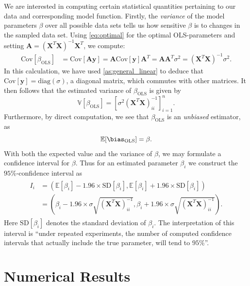 \documentclass[dvipsnames, article, a4paper, oneside, 12pt]{memoir}
\newcommand{\X}{\bm{X}}
\newcommand{\diag}[1]{\mathrm{diag}(#1)}
\newcommand{\expect}{\mathbb{E}}
\newcommand{\var}{\mathbb{V}}
\newcommand{\cov}{\mathrm{Cov}}
\newcommand{\OLS}{\mathrm{OLS}}
\newcommand{\SD}{\mathrm{SD}}
\newcommand{\mat}[1]{\bm{#1}}
\newcommand{\y}{\bm{y}}
\begin{document}
  We are interested in computing certain statistical quantities pertaining to
  our data and corresponding model function. Firstly, the \emph{variance} of
  the model parameters \( \beta \) over all possible data sets tells us how
  sensitive \( \beta \) is to changes in the sampled data set. Using
  \cref{eq:optimal} for the optimal OLS-parameters and setting \( \mat{A} =
  (\X^T\X)^{-1}\X^T\), we compute:
  \begin{align}
	  \label{eq:ols_variance}
	  \cov\left[\beta_{\OLS}\right] &= \cov\left[\mat{A}\y\right] = \mat{A} \cov\left[\y\right] \mat{A}^T = \mat{A}\mat{A}^T\sigma^2 = (\X^T{\X})^{-1} \sigma^2.
  \end{align}
  In this calculation, we have used \cref{as:general_linear} to deduce that \(
  \cov[ \y ] = \diag{\sigma}\), a diagonal matrix, which commutes with other
  matrices. It then follows that the estimated variance of \( \beta_{\OLS} \) is given by
  \begin{equation}
	  \var[\beta_{\OLS}] = [\sigma^2 (\X^T\X)^{-1}_{ii} ]_{i=1}^n.
  \end{equation}
  Furthermore, by direct computation, we see that \( \beta_{\OLS} \) is an \emph{unbiased} estimator,
  as 
  \begin{equation}
	  \expect[\bias_{\OLS}] = \beta.
  \end{equation}
  With both the expected value and the variance of \( \beta \), we may
  formulate a confidence interval for \( \beta \). Thus for an estimated
  parameter \( \beta_i \) we construct the
  \(95\%\)-confidence interval as
  \begin{align}
	  \begin{split}
		  I_i &= (\expect[\beta_i] - 1.96 \times \SD[\beta_i], \expect[\beta_i] + 1.96 \times \SD[\beta_i]) \\
		      &= \left(\beta_i - 1.96 \times \sigma \sqrt{(\X^T\X)^{-1}_{ii}}, \beta_i + 1.96 \times \sigma \sqrt{(\X^T\X)^{-1}_{ii}}\right).
	  \end{split}
  \end{align}
  Here \( \SD[\beta_i] \) denotes the standard deviation of \( \beta_i \).  The
  interpretation of this interval is  ``under repeated experiments, the number
  of computed confidence intervals that actually include the true parameter,
  will tend to \( 95\% \)''.
  



  \chapter{Numerical Results}
\end{document}
